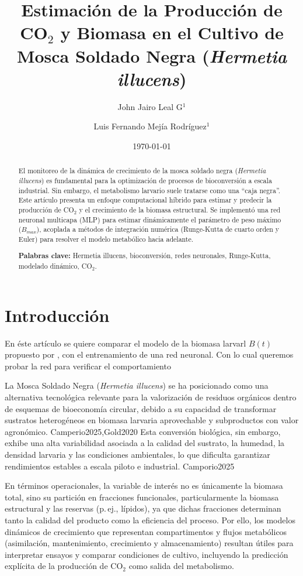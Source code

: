 \documentclass[11pt,a4paper]{article}
\title{\textbf{Estimación de la Producción de CO$_2$ y Biomasa en el Cultivo de Mosca Soldado Negra (\textit{Hermetia illucens})}}
\author{John Jairo Leal G$^{1}$ \and Luis Fernando Mejía Rodríguez$^{1}$}
\date{\today}
\begin{document}
\maketitle

\begin{abstract}
El monitoreo de la dinámica de crecimiento de la mosca soldado negra (\textit{Hermetia illucens}) es fundamental para la optimización de procesos de bioconversión a escala industrial. Sin embargo, el metabolismo larvario suele tratarse como una ``caja negra''. Este artículo presenta un enfoque computacional híbrido para estimar y predecir la producción de CO$_2$ y el crecimiento de la biomasa estructural. Se implementó una red neuronal multicapa (MLP) para estimar dinámicamente el parámetro de peso máximo ($B_{max}$), acoplada a métodos de integración numérica (Runge-Kutta de cuarto orden y Euler) para resolver el modelo metabólico hacia adelante.

\textbf{Palabras clave:} Hermetia illucens, bioconversión, redes neuronales, Runge-Kutta, modelado dinámico, CO$_2$.
\end{abstract}

\section{Introducción}
En éste artículo se quiere comparar el modelo de la biomasa larvarl $B(t)$ 
propuesto por \parencite{eriksenDynamicModellingFeed2022}, con el entrenamiento de una red neuronal. Con lo cual queremos probar la red para verificar el comportamiento

La Mosca Soldado Negra (\textit{Hermetia illucens}) se ha posicionado como una alternativa tecnológica relevante para la valorización de residuos orgánicos dentro de esquemas de bioeconomía circular, debido a su capacidad de transformar sustratos heterogéneos en biomasa larvaria aprovechable y subproductos con valor agronómico. Camperio2025,Gold2020 \cite{goldEffectsRearingSystem2022} Esta conversión biológica, sin embargo, exhibe una alta variabilidad asociada a la calidad del sustrato, la humedad, la densidad larvaria y las condiciones ambientales, lo que dificulta garantizar rendimientos estables a escala piloto e industrial. \cite{eriksenDynamicModellingFeed2022} Camporio2025

En términos operacionales, la variable de interés no es únicamente la biomasa total, sino su partición en fracciones funcionales, particularmente la biomasa estructural y las reservas (p.\,ej., lípidos), ya que dichas fracciones determinan tanto la calidad del producto como la eficiencia del proceso. \cite{eriksenDynamicModellingFeed2022} Por ello, los modelos dinámicos de crecimiento que representan compartimentos y flujos metabólicos (asimilación, mantenimiento, crecimiento y almacenamiento) resultan útiles para interpretar ensayos y comparar condiciones de cultivo, incluyendo la predicción explícita de la producción de CO$_2$ como salida del metabolismo. \cite{eriksenDynamicModellingFeed2022}
\end{document}
